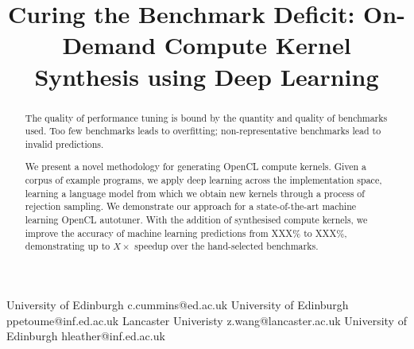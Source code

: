 \documentclass[preprint,nonatbib,10pt,nocopyrightspace]{sigplanconf}
\begin{document}
\setlength{\pdfpageheight}{\paperheight}
\setlength{\pdfpagewidth}{\paperwidth}






\title{Curing the Benchmark Deficit: On-Demand Compute Kernel
  Synthesis using Deep Learning}


           {University of Edinburgh}
           {c.cummins@ed.ac.uk}
           {University of Edinburgh}
           {ppetoume@inf.ed.ac.uk}
           {Lancaster Univeristy}
           {z.wang@lancaster.ac.uk}
           {University of Edinburgh}
           {hleather@inf.ed.ac.uk}

\maketitle

\begin{abstract}
  The quality of performance tuning is bound by the quantity and
  quality of benchmarks used. Too few benchmarks leads to overfitting;
  non-representative benchmarks lead to invalid predictions.

  We present a novel methodology for generating OpenCL compute
  kernels. Given a corpus of example programs, we apply deep learning
  across the implementation space, learning a language model from
  which we obtain new kernels through a process of rejection
  sampling. %
  We demonstrate our approach for a state-of-the-art machine learning
  OpenCL autotuner. With the addition of synthesised compute kernels,
  we improve the accuracy of machine learning predictions from XXX\%
  to XXX\%, demonstrating up to $X\times$ speedup over the
  hand-selected benchmarks.
\end{abstract}
\end{document}
